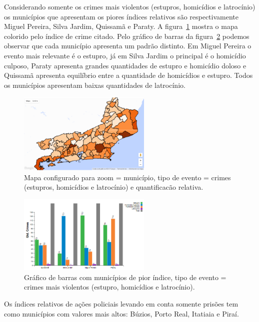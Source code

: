 \documentclass[10pt,conference]{IEEEtran}
\begin{document}
Considerando somente os crimes mais violentos (estupros, homicídios e latrocínio) os municípios que apresentam os piores índices relativos são respectivamente Miguel Pereira, Silva Jardim, Quissamã e Paraty. A figura~\ref{fig_mapaCrimesViolentos} mostra o mapa colorido pelo índice de crime citado. Pelo gráfico de barras da figura~\ref{fig_barraCrimesViolentosMunicipios} podemos observar que cada município apresenta um padrão distinto. Em Miguel Pereira o evento mais relevante é o estupro, já em Silva Jardim o principal é o homicídio culposo, Paraty apresenta grandes quantidades de estupro e homicídio doloso  e Quissamã apresenta equilíbrio entre a quantidade de homicídios e estupro. Todos os municípios apresentam baixas quantidades de latrocínio.

\begin{figure}[!t]
\centering
\includegraphics[width=2.5in]{mapaCrimesViolentos.png}
\caption{Mapa configurado para zoom = município, tipo de evento = crimes (estupros, homicídios e latrocínio) e quantificacão relativa.}
\label{fig_mapaCrimesViolentos}
\end{figure}

\begin{figure}[!t]
\centering
\includegraphics[width=2.5in]{crimesViolentosBarrasMaioresIndices.png}
\caption{Gráfico de barras com municípios de pior índice, tipo de evento = crimes mais violentos (estupro, homicídios e latrocínio).}
\label{fig_barraCrimesViolentosMunicipios}
\end{figure}

Os índices relativos de ações policiais levando em conta somente prisões tem como municípios com valores mais altos: Búzios, Porto Real, Itatiaia e Piraí.
\end{document}
